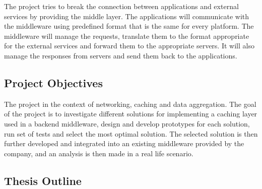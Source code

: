 The project tries to break the connection between applications and external services by providing the middle layer. The applications will communicate with the middleware using predefined format that is the same for every platform. The middleware will manage the requests, translate them to the format appropriate for the external services and forward them to the appropriate servers. It will also manage the responses from servers and send them back to the applications.


\subsection{Project Objectives}

The project in the context of networking, caching and data aggregation. The goal of the project is to investigate different solutions for implementing a caching layer used in a backend middleware, design and develop prototypes for each solution, run set of tests and select the most optimal solution.
The selected solution is then further developed and integrated into an existing middleware provided by the company, and an analysis is then made in a real life scenario.


\subsection{Thesis Outline}

\newpage
